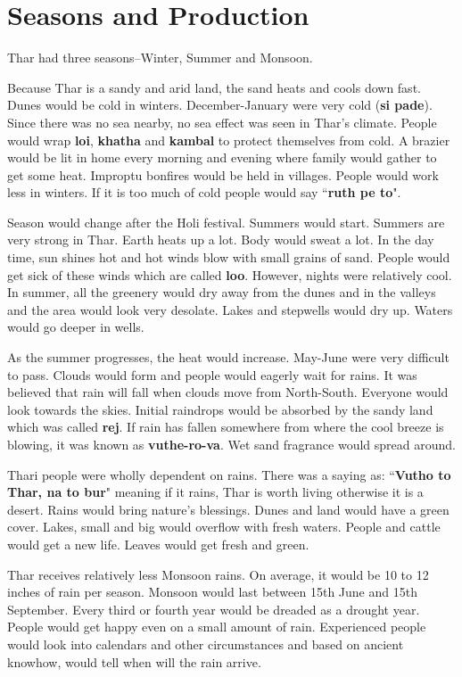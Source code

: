 \chapter{Seasons and Production}
Thar had three seasons--Winter, Summer and Monsoon.

Because Thar is a sandy and arid land, the sand heats and cools down fast.
Dunes would be cold in winters. December-January were very cold (\textbf{si
pade}). Since there was no sea nearby, no sea effect was seen in Thar's climate.
People would wrap \textbf{loi}, \textbf{khatha} and \textbf{kambal} to protect
themselves from cold. A brazier would be lit in home every morning and evening
where family would gather to get some heat. Improptu bonfires would be held in
villages. People would work less in winters. If it is too much of cold people
would say ``\textbf{ruth pe to}".

Season would change after the Holi festival. Summers would start. Summers are
very strong in Thar. Earth heats up a lot. Body would sweat a lot. In the day
time, sun shines hot and hot winds blow with small grains of sand. People would
get sick of these winds which are called \textbf{loo}. However, nights were
relatively cool. In summer, all the greenery would dry away from the dunes and
in the valleys and the area would look very desolate. Lakes and stepwells would
dry up. Waters would go deeper in wells.

As the summer progresses, the heat would increase. May-June were very difficult
to pass. Clouds would form and people would eagerly wait for rains. It was
believed that rain will fall when clouds move from North-South. Everyone would
look towards the skies. Initial raindrops would be absorbed by the sandy land
which was called \textbf{rej}. If rain has fallen somewhere from where the cool
breeze is blowing, it was known as \textbf{vuthe-ro-va}. Wet sand fragrance
would spread around.

Thari people were wholly dependent on rains. There was a saying as:
``\textbf{Vutho to Thar, na to bur}" meaning if it rains, Thar is worth living
otherwise it is a desert. Rains would bring nature's blessings. Dunes and land
would have a green cover. Lakes, small and big would overflow with fresh
waters. People and cattle would get a new life. Leaves would get fresh and
green.

Thar receives relatively less Monsoon rains. On average, it would be 10 to 12
inches of rain per season. Monsoon would last between 15th June and 15th
September. Every third or fourth year would be dreaded as a drought year.
People would get happy even on a small amount of rain. Experienced people would
look into calendars and other circumstances and based on ancient knowhow, would
tell when will the rain arrive.

